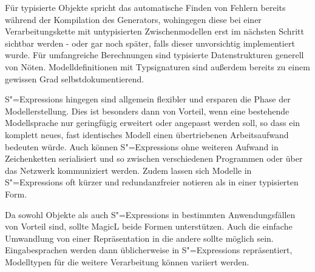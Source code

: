 \documentclass[11pt, a4paper, bibgerm]{scrbook}
\newcommand{\sexps}{S"=Expressions}
\begin{document}
Für typisierte Objekte spricht das automatische Finden von Fehlern
bereits während der Kompilation des Generators, wohingegen diese bei
einer Verarbeitungskette mit untypisierten Zwischenmodellen erst im
nächsten Schritt sichtbar werden - oder gar noch später,
falls dieser unvorsichtig implementiert wurde. Für umfangreiche
Berechnungen sind typisierte Datenstrukturen generell
von Nöten. Modelldefinitionen mit Typsignaturen sind außerdem bereits zu
einem gewissen Grad selbstdokumentierend.

\sexps{} hingegen sind allgemein flexibler und ersparen die Phase der
Modellerstellung. Dies ist besonders dann von Vorteil, wenn eine
bestehende Modellsprache nur geringfügig erweitert oder angepasst werden
soll, so dass ein komplett neues, fast identisches Modell einen
übertriebenen Arbeitsaufwand bedeuten würde. Auch können \sexps{} ohne
weiteren Aufwand in Zeichenketten serialisiert und so zwischen
verschiedenen Programmen oder über das Netzwerk kommuniziert
werden. Zudem lassen sich Modelle in \sexps{} oft kürzer und
redundanzfreier notieren als in einer typisierten Form.

Da sowohl Objekte als auch \sexps{} in bestimmten Anwendungsfällen von
Vorteil sind, sollte MagicL beide Formen unterstützen. Auch die
einfache Umwandlung von einer Repräsentation in die andere sollte
möglich sein. Eingabesprachen werden dann üblicherweise in \sexps{}
repräsentiert, Modelltypen für die weitere Verarbeitung können variiert
werden.
\end{document}
